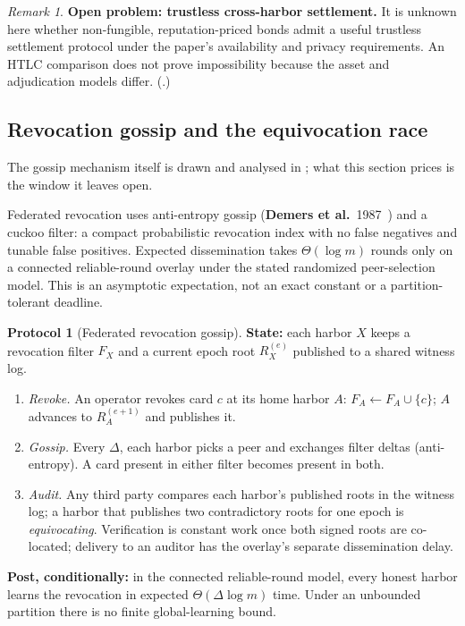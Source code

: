 \documentclass[11pt,a4paper]{article}
\theoremstyle{definition}
\theoremstyle{definition}
\newtheorem{protocol}{Protocol}[section]
\theoremstyle{remark}
\newtheorem*{remark}{Remark}
\begin{document}
\begin{remark}\label{conj:trustless}
\textbf{Open problem: trustless cross-harbor settlement.} It is unknown here whether
non-fungible, reputation-priced bonds admit a useful trustless settlement protocol
under the paper's availability and privacy requirements. An HTLC comparison does not
prove impossibility because the asset and adjudication models differ. (\Open{}.)
\end{remark}

\subsection{Revocation gossip and the equivocation race}\label{sec:fh-revocation}\label{sec:revocation}

\ifpdbook
The gossip mechanism itself is drawn and analysed in ;
what this section prices is the window it leaves open.
\else

\fi

Federated revocation uses anti-entropy gossip
(\textbf{Demers et al.}~1987~) and a cuckoo filter: a compact
probabilistic revocation index with no false negatives and tunable false positives.
Expected dissemination takes $\Theta(\log m)$ rounds only on a connected
reliable-round overlay under the stated randomized peer-selection model.
This is an asymptotic expectation, not an exact constant or a partition-tolerant deadline.

\begin{protocol}[Federated revocation gossip]\label{prot:gossip}
\textbf{State:} each harbor $X$ keeps a revocation filter $F_X$ and a current epoch
root $R_X^{(e)}$ published to a shared witness log.
\begin{enumerate}[leftmargin=2.0em,itemsep=1pt,topsep=2pt]
  \item \emph{Revoke.} An operator revokes card $c$ at its home harbor $A$:
    $F_A \leftarrow F_A \cup \{c\}$; $A$ advances to $R_A^{(e+1)}$ and publishes it.
  \item \emph{Gossip.} Every $\Delta$, each harbor picks a peer and exchanges filter
    deltas (anti-entropy). A card present in either filter becomes present in both.
  \item \emph{Audit.} Any third party compares each harbor's published roots in the
    witness log; a harbor that publishes two contradictory roots for one epoch is
    \emph{equivocating}. Verification is constant work once both signed roots are
    co-located; delivery to an auditor has the overlay's separate dissemination delay.
\end{enumerate}
{\relax
\textbf{Post, conditionally:} in the connected reliable-round model, every honest
harbor learns the revocation in expected $\Theta(\Delta\log m)$ time. Under an
unbounded partition there is no finite global-learning bound.
\par}
\end{protocol}
\end{document}
